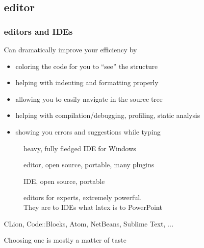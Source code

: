 \subsection[edit]{\cpp editor}

\begin{frame}[fragile]
  \frametitle{\cpp editors and IDEs}
  \begin{block}{Can dramatically improve your efficiency by}
    \begin{itemize}
      \item coloring the code for you to ``see'' the structure
      \item helping with indenting and formatting properly
      \item allowing you to easily navigate in the source tree
      \item helping with compilation/debugging, profiling, static analysis
      \item showing you errors and suggestions while typing
    \end{itemize}
  \end{block}
  \begin{block}{}
    \begin{description}
    \item[\href{http://www.microsoft.com/}{}]
      heavy, fully fledged IDE for Windows
    \item[\href{https://code.visualstudio.com/}{}]
      editor, open source, portable, many plugins
    \item[\href{https://www.eclipse.org/}{}]
      IDE, open source, portable
    \item[\href{http://www.gnu.org/software/emacs/}{} \href{https://www.vim.org/}{}]
      editors for experts, extremely powerful. \\
      They are to IDEs what latex is to PowerPoint
    \item[CLion, Code::Blocks, Atom, NetBeans, Sublime Text, ...]
    \end{description}
    Choosing one is mostly a matter of taste
  \end{block}
\end{frame}
